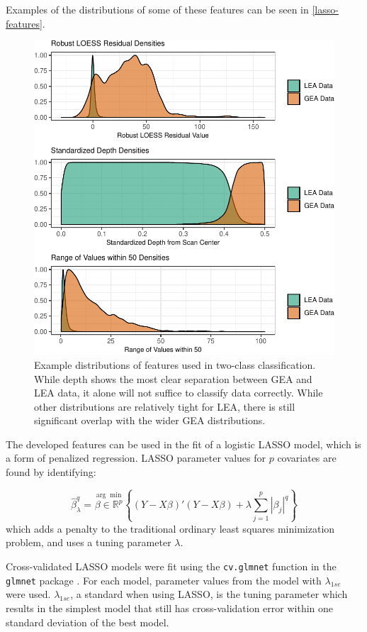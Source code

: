 \documentclass[12pt]{article}
\begin{document}
Examples of the distributions of some of these features can be seen in
\autoref{lasso-features}.

\begin{figure}
\centering
\includegraphics{writeup_files/figure-latex/lasso-features-1.pdf}
\caption{\label{lasso-features}Example distributions of features used in
two-class classification. While depth shows the most clear separation
between GEA and LEA data, it alone will not suffice to classify data
correctly. While other distributions are relatively tight for LEA, there
is still significant overlap with the wider GEA distributions.}
\end{figure}

The developed features can be used in the fit of a logistic LASSO model,
which is a form of penalized regression. LASSO parameter values for
\(p\) covariates are found by identifying:

\[
\hat{\beta}_{\lambda}^q = \stackrel{\arg\min}{\beta \in \mathbb{R}^p} \left\{  (Y - X\beta)'(Y - X\beta) + \lambda \sum_{j=1}^{p}|\beta_j|^q\right\}
\] which adds a penalty to the traditional ordinary least squares
minimization problem, and uses a tuning parameter \(\lambda\).

Cross-validated LASSO models were fit using the \texttt{cv.glmnet}
function in the \texttt{glmnet} package \cite{glmnet}. For each model,
parameter values from the model with \(\lambda_{1se}\) were used.
\(\lambda_{1se}\), a standard when using LASSO, is the tuning parameter
which results in the simplest model that still has cross-validation
error within one standard deviation of the best model.
\end{document}
